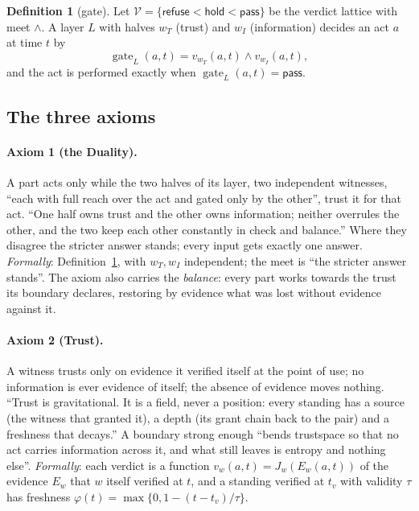 \documentclass[11pt,a4paper]{article}
\theoremstyle{definition}
\newtheorem{definition}{Definition}
\theoremstyle{remark}
\theoremstyle{definition}
\begin{document}
\begin{definition}[gate]\label{def:gate}
Let $\mathcal V=\{\textsf{refuse}<\textsf{hold}<\textsf{pass}\}$ be the verdict lattice with meet $\wedge$. A layer $L$ with halves $w_T$
(trust) and $w_I$ (information) decides an act $a$ at time $t$ by
\[
\operatorname{gate}_L(a,t)=v_{w_T}(a,t)\wedge v_{w_I}(a,t),
\]
and the act is performed exactly when $\operatorname{gate}_L(a,t)=\textsf{pass}$.
\end{definition}

\subsection{The three axioms}

\paragraph{Axiom 1 (the Duality).} A part acts only while the two halves of its layer, two independent witnesses, ``each with full reach
over the act and gated only by the other'', trust it for that act. ``One half owns trust and the other owns information; neither overrules
the other, and the two keep each other constantly in check and balance.'' Where they disagree the stricter answer stands; every input
gets exactly one answer. \emph{Formally}: Definition~\ref{def:gate}, with $w_T,w_I$ independent; the meet is ``the stricter answer
stands''. The axiom also carries the \emph{balance}: every part works towards the trust its boundary declares, restoring by evidence what
was lost without evidence against it.

\paragraph{Axiom 2 (Trust).} A witness trusts only on evidence it verified itself at the point of use; no information is ever evidence of
itself; the absence of evidence moves nothing. ``Trust is gravitational. It is a field, never a position: every standing has a source
(the witness that granted it), a depth (its grant chain back to the pair) and a freshness that decays.'' A boundary strong enough ``bends
trustspace so that no act carries information across it, and what still leaves is entropy and nothing else''. \emph{Formally}: each
verdict is a function $v_w(a,t)=J_w(E_w(a,t))$ of the evidence $E_w$ that $w$ itself verified at $t$, and a standing verified at $t_v$
with validity $\tau$ has freshness $\varphi(t)=\max\{0,1-(t-t_v)/\tau\}$.
\end{document}
